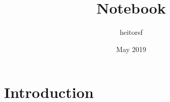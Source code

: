 \documentclass{article}
\title{Notebook}
\author{heitorsf }
\date{May 2019}
\begin{document}
\maketitle

\section{Introduction}
\end{document}
